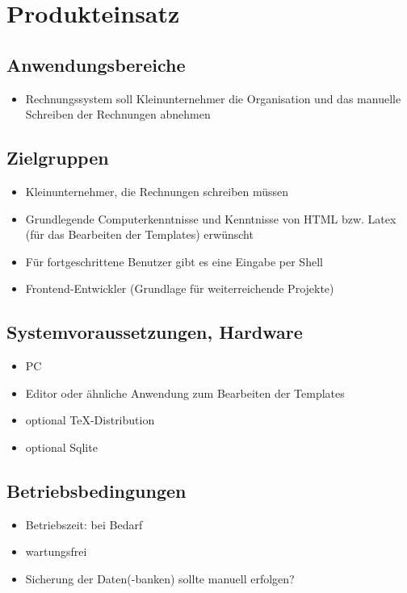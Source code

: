 
\section{Produkteinsatz}


\subsection{Anwendungsbereiche}

\begin{itemize}
	\item Rechnungssystem soll Kleinunternehmer die Organisation und das manuelle Schreiben der Rechnungen abnehmen
\end{itemize}

\subsection{Zielgruppen}

\begin{itemize}
	\item Kleinunternehmer, die Rechnungen schreiben müssen
	\item Grundlegende Computerkenntnisse und Kenntnisse von HTML bzw. Latex (für das Bearbeiten der Templates) erwünscht
	\item Für fortgeschrittene Benutzer gibt es eine Eingabe per Shell
	\item Frontend-Entwickler (Grundlage für weiterreichende Projekte)
\end{itemize}

\subsection{Systemvoraussetzungen, Hardware}

\begin{itemize}
	\item PC
	\item Editor oder ähnliche Anwendung zum Bearbeiten der Templates
	\item optional TeX-Distribution
	\item optional Sqlite
\end{itemize}

\subsection{Betriebsbedingungen}

\begin{itemize}
	\item Betriebszeit: bei Bedarf
	\item wartungsfrei
	\item Sicherung der Daten(-banken) sollte manuell erfolgen?
\end{itemize}